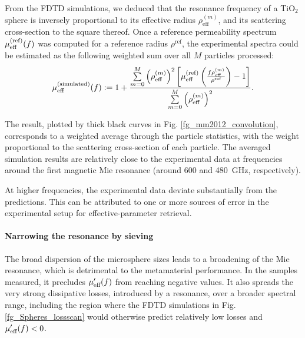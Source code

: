 From the FDTD simulations, we deduced that the resonance frequency of a TiO$_{2}$ sphere is inversely proportional to its effective radius $\rho_{\text{eff}}^{(m)}$, and its scattering cross-section to the square thereof. Once a reference permeability spectrum $\mu_{\text{eff} }^{\text{(ref)}}(f)$ was computed for a reference radius $\rho^{\text{ref}}$, the experimental spectra could be estimated as the following weighted sum over all $M$ particles processed:
\begin{equation} \mu_{\text{eff} }^{\text{(simulated)}}(f) := 1 + \frac{\sum\limits_{m=0}^{M} \left(\rho_{\text{eff}}^{(m)}\right)^{2} \left[ \mu_{\text{eff} }^{\text{(ref)}}\left(\frac{f \rho_{\text{eff}}^{(m)}}{\rho^{\text{ref}} }\right) - 1 \right]}{\sum\limits_{m=0}^{M} \left(\rho_{\text{eff}}^{(m)}\right)^{2}}. \label{eq_sumconvol}\end{equation}

	The result, plotted by thick black curves in Fig. \ref{fg_mm2012_convolution}, corresponds to a weighted average through the particle statistics, with the weight proportional to the scattering cross-section of each particle. The averaged simulation results are relatively close to the experimental data at frequencies around the first magnetic Mie resonance (around 600 and 480~GHz, respectively). 
	
	At higher frequencies, the experimental data deviate substantially from the predictions. This can be attributed to one or more sources of error in the experimental setup for effective-parameter retrieval.



\paragraph{Narrowing the resonance by sieving} %
The broad dispersion of the microsphere sizes leads to a broadening of the Mie resonance, which is detrimental to the metamaterial performance. In the samples measured, it precludes $\mu_{\text{eff} }'(f)$ from reaching negative values. It also spreads the very strong dissipative losses, introduced by a resonance, over a broader spectral range, including the region where the FDTD simulations in Fig. \ref{fg_Spheres_lossscan} would otherwise predict relatively low losses and $\mu_{\text{eff} }'(f) < 0$.


